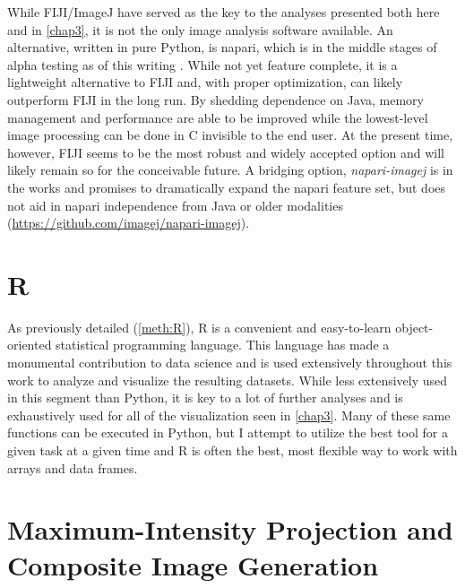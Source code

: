 While FIJI/ImageJ have served as the key to the analyses presented both here and in \autoref{chap3}, it is not the only image analysis software available. An alternative, written in pure Python, is napari, which is in the middle stages of alpha testing as of this writing \citep{napari2022}. While not yet feature complete, it is a lightweight alternative to FIJI and, with proper optimization, can likely outperform FIJI in the long run. By shedding dependence on Java, memory management and performance are able to be improved while the lowest\hyp{}level image processing can be done in C invisible to the end user. At the present time, however, FIJI seems to be the most robust and widely accepted option and will likely remain so for the conceivable future. A bridging option, \textit{napari\hyp{}imagej} is in the works and promises to dramatically expand the napari feature set, but does not aid in napari independence from Java or older modalities (\url{https://github.com/imagej/napari-imagej}).

\section{R}\label{R}

As previously detailed (\autoref{meth:R}), R is a convenient and easy\hyp{}to\hyp{}learn object\hyp{}oriented statistical programming language. This language has made a monumental contribution to data science and is used extensively throughout this work to analyze and visualize the resulting datasets. While less extensively used in this segment than Python, it is key to a lot of further analyses and is exhaustively used for all of the visualization seen in \autoref{chap3}. Many of these same functions can be executed in Python, but I attempt to utilize the best tool for a given task at a given time and R is often the best, most flexible way to work with arrays and data frames.

\section{Maximum\hyp{}Intensity Projection and Composite Image Generation}\label{mippers}

